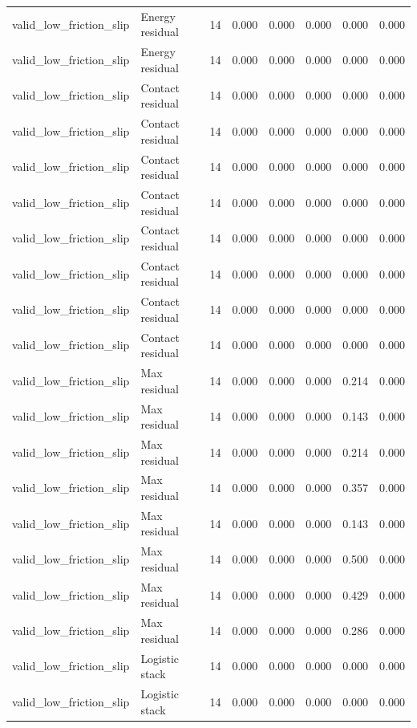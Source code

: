 {\begin{longtable}{llrrrrrr}
valid\_low\_friction\_slip & Energy residual & 14 & 0.000 & 0.000 & 0.000 & 0.000 & 0.000 \\
valid\_low\_friction\_slip & Energy residual & 14 & 0.000 & 0.000 & 0.000 & 0.000 & 0.000 \\
valid\_low\_friction\_slip & Contact residual & 14 & 0.000 & 0.000 & 0.000 & 0.000 & 0.000 \\
valid\_low\_friction\_slip & Contact residual & 14 & 0.000 & 0.000 & 0.000 & 0.000 & 0.000 \\
valid\_low\_friction\_slip & Contact residual & 14 & 0.000 & 0.000 & 0.000 & 0.000 & 0.000 \\
valid\_low\_friction\_slip & Contact residual & 14 & 0.000 & 0.000 & 0.000 & 0.000 & 0.000 \\
valid\_low\_friction\_slip & Contact residual & 14 & 0.000 & 0.000 & 0.000 & 0.000 & 0.000 \\
valid\_low\_friction\_slip & Contact residual & 14 & 0.000 & 0.000 & 0.000 & 0.000 & 0.000 \\
valid\_low\_friction\_slip & Contact residual & 14 & 0.000 & 0.000 & 0.000 & 0.000 & 0.000 \\
valid\_low\_friction\_slip & Contact residual & 14 & 0.000 & 0.000 & 0.000 & 0.000 & 0.000 \\
valid\_low\_friction\_slip & Max residual & 14 & 0.000 & 0.000 & 0.000 & 0.214 & 0.000 \\
valid\_low\_friction\_slip & Max residual & 14 & 0.000 & 0.000 & 0.000 & 0.143 & 0.000 \\
valid\_low\_friction\_slip & Max residual & 14 & 0.000 & 0.000 & 0.000 & 0.214 & 0.000 \\
valid\_low\_friction\_slip & Max residual & 14 & 0.000 & 0.000 & 0.000 & 0.357 & 0.000 \\
valid\_low\_friction\_slip & Max residual & 14 & 0.000 & 0.000 & 0.000 & 0.143 & 0.000 \\
valid\_low\_friction\_slip & Max residual & 14 & 0.000 & 0.000 & 0.000 & 0.500 & 0.000 \\
valid\_low\_friction\_slip & Max residual & 14 & 0.000 & 0.000 & 0.000 & 0.429 & 0.000 \\
valid\_low\_friction\_slip & Max residual & 14 & 0.000 & 0.000 & 0.000 & 0.286 & 0.000 \\
valid\_low\_friction\_slip & Logistic stack & 14 & 0.000 & 0.000 & 0.000 & 0.000 & 0.000 \\
valid\_low\_friction\_slip & Logistic stack & 14 & 0.000 & 0.000 & 0.000 & 0.000 & 0.000 \\

\end{longtable}}
